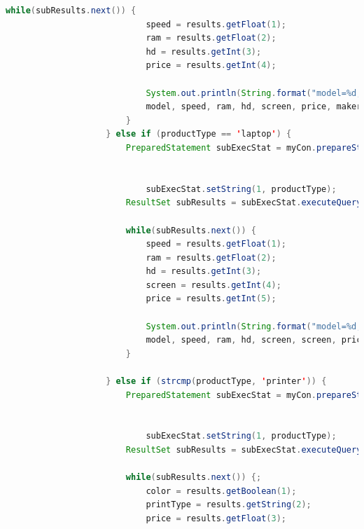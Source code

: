 \documentclass[12pt]{article}
\begin{document}
\begin{enumerate}[1.]
\begin{enumerate}[a)]
\begin{lstlisting}[language=JAVA]
                        while(subResults.next()) {
                            speed = results.getFloat(1);
                            ram = results.getFloat(2);
                            hd = results.getInt(3);
                            price = results.getInt(4);

                            System.out.println(String.format("model=%d, speed=%.2f, ram=%d, hd=%d, price=%.2f, maker=%c, type=%s",
                            model, speed, ram, hd, screen, price, maker, productType));
                        }
                    } else if (productType == 'laptop') {
                        PreparedStatement subExecStat = myCon.prepareStatement("SELECT speed, ram, hd, screen, price FROM Laptop " +
                                                                                "NATURAL JOIN Product " +
                                                                                "WHERE type= ?");
                            subExecStat.setString(1, productType);
                        ResultSet subResults = subExecStat.executeQuery();

                        while(subResults.next()) {
                            speed = results.getFloat(1);
                            ram = results.getFloat(2);
                            hd = results.getInt(3);
                            screen = results.getInt(4);
                            price = results.getInt(5);

                            System.out.println(String.format("model=%d, speed=%.2f, ram=%d, hd=%d, screen=%d, price=%.2f, maker=%c, type=%s",
                            model, speed, ram, hd, screen, screen, price, maker, productType));
                        }

                    } else if (strcmp(productType, 'printer')) {
                        PreparedStatement subExecStat = myCon.prepareStatement("SELECT color, printType, price FROM Printer " +
                                                                                "NATURAL JOIN Product " +
                                                                                "WHERE type= ?");
                            subExecStat.setString(1, productType);
                        ResultSet subResults = subExecStat.executeQuery();

                        while(subResults.next()) {;
                            color = results.getBoolean(1);
                            printType = results.getString(2);
                            price = results.getFloat(3);


\end{lstlisting}
\end{enumerate}
\end{enumerate}
\end{document}
